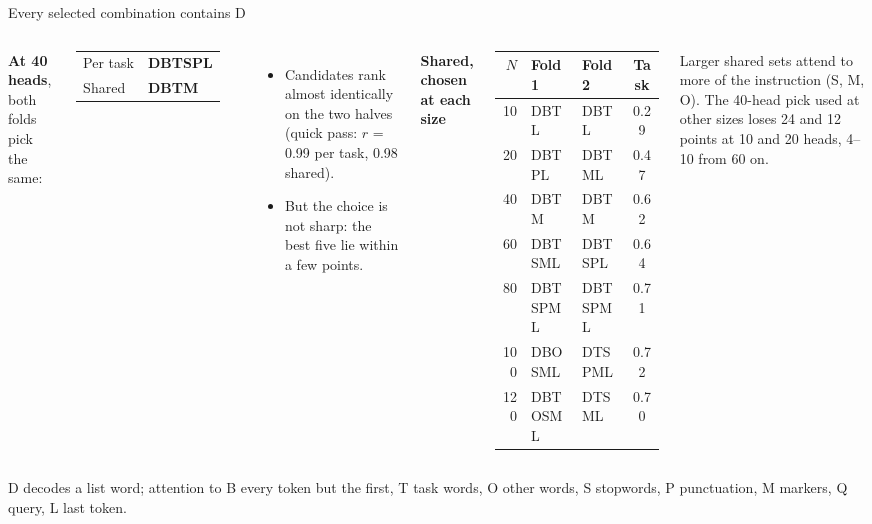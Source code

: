 \documentclass[aspectratio=169,11pt,xcolor=table]{beamer}
\newcommand{\gnote}[1]{{\footnotesize\color{gray}#1}}
\newcommand{\spaced}{\setlength{\itemsep}{0.55em}}
\begin{document}
\begin{frame}{Every selected combination contains D}
\begin{columns}[T]
\textbf{At 40 heads}, both folds pick the same:\\[4pt]
\small
\begin{tabular}{@{}ll@{}}
Per task & \textbf{DBTSPL} \\
Shared & \textbf{DBTM} \\
\end{tabular}

\vspace{1em}
\begin{itemize}\spaced
\item Candidates rank almost identically on the two halves (quick pass: $r$ = 0.99 per task, 0.98 shared).
\item But the choice is not sharp: the best five lie within a few points.
\end{itemize}

\textbf{Shared, chosen at each size}\\[4pt]
\footnotesize
\begin{tabular}{@{}rllc@{}}
\toprule
$N$ & Fold 1 & Fold 2 & Task \\
\midrule
10 & DBTL & DBTL & 0.29 \\
20 & DBTPL & DBTML & 0.47 \\
40 & DBTM & DBTM & 0.62 \\
60 & DBTSML & DBTSPL & 0.64 \\
80 & DBTSPML & DBTSPML & 0.71 \\
100 & DBOSML & DTSPML & 0.72 \\
120 & DBTOSML & DTSML & 0.70 \\
\bottomrule
\end{tabular}

\vspace{0.4em}
\small Larger shared sets attend to more of the instruction (S, M, O).
The 40-head pick used at other sizes loses 24 and 12 points at 10 and 20 heads, 4--10 from 60 on.
\end{columns}
\vfill
\gnote{D decodes a list word; attention to B every token but the first, T task words, O other words,
S stopwords, P punctuation, M markers, Q query, L last token.}
\end{frame}
\end{document}
